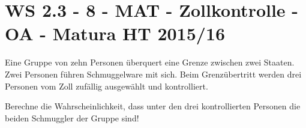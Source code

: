 \section{WS 2.3 - 8 - MAT - Zollkontrolle - OA - Matura HT 2015/16}

\begin{beispiel}[WS 2.3]{1} %
Eine Gruppe von zehn Personen überquert eine Grenze zwischen zwei Staaten. Zwei Personen
führen Schmuggelware mit sich. Beim Grenzübertritt werden drei Personen vom Zoll zufällig ausgewählt und kontrolliert.

Berechne die Wahrscheinlichkeit, dass unter den drei kontrollierten Personen die beiden
Schmuggler der Gruppe sind!

\end{beispiel}